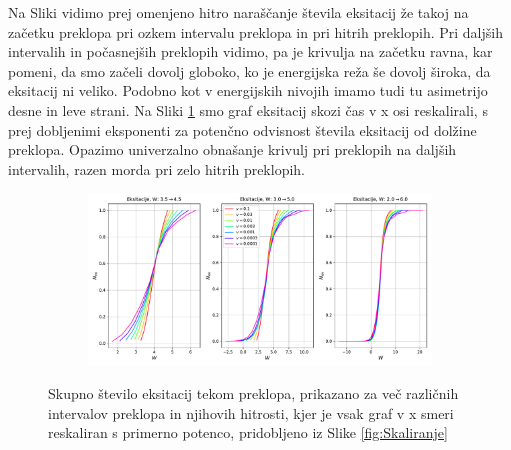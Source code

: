 Na Sliki \label{fig:SkoziCas} vidimo prej omenjeno hitro naraščanje števila eksitacij že takoj na začetku preklopa pri ozkem intervalu preklopa in pri hitrih preklopih.
Pri daljših intervalih in počasnejših preklopih vidimo, pa je krivulja na začetku ravna, kar pomeni, da smo začeli dovolj globoko, ko je energijska reža še dovolj široka, da eksitacij ni veliko. Podobno kot v energijskih nivojih imamo tudi tu asimetrijo desne in leve strani.
Na Sliki \ref{fig:SkoziCasAlt} smo graf eksitacij skozi čas v x osi reskalirali, s prej dobljenimi eksponenti za potenčno odvisnost števila eksitacij od dolžine preklopa. Opazimo univerzalno obnašanje krivulj pri preklopih na daljših intervalih, razen morda pri zelo hitrih preklopih.
\begin{figure}[H]
\centering
\begin{subfigure}{.99\textwidth}
\includegraphics[width=\linewidth]{Figures/SkoziCasAlt.pdf}
\end{subfigure}
\caption{Skupno število eksitacij tekom preklopa, prikazano za več različnih intervalov preklopa in njihovih hitrosti, kjer je vsak graf v x smeri reskaliran s primerno potenco, pridobljeno iz Slike \ref{fig:Skaliranje}}
\label{fig:SkoziCasAlt}
\end{figure}

